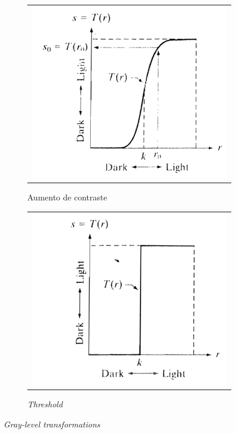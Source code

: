 \begin{figure}[!h]
\begin{subfigure}{.5\textwidth}
  \centering
    \begin{tabular}{c}
      \includegraphics[width=1\textwidth]{images/03/01.png}
    \end{tabular}
  \caption{\label{fig:contrast} Aumento de contraste}
\end{subfigure}
\begin{subfigure}{.5\textwidth}
  \centering
    \begin{tabular}{c}
      \includegraphics[width=1\textwidth]{images/03/02.png}
    \end{tabular}
  \caption{\label{fig:thresh} \textit{Threshold}}
\end{subfigure}
\caption{\label{fig:gray} \textit{Gray-level transformations}}
\end{figure}


